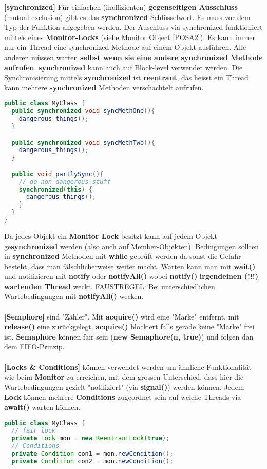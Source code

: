 \documentclass[8pt]{extarticle}
\let\oldtextbf\textbf
\renewcommand{\textbf}{\tiny\oldtextbf}
\begin{document}
\begin{multicols*}{5}
\textbf{[synchronized]} Für einfachen (ineffizienten) \textbf{gegenseitigen Ausschluss} (mutual exclusion) gibt es das \textbf{synchronized} Schlüsselwort. Es muss vor dem Typ der Funktion angegeben werden. Der Auschluss via synchronized funktioniert mittels eines \textbf{Monitor-Locks} (siehe Monitor Object [POSA2]). Es kann immer nur ein Thread eine synchronized Methode auf einem Objekt ausführen. Alle anderen müssen warten \textbf{selbst wenn sie eine andere synchronized Methode aufrufen}. \textbf{synchronized} kann auch auf Block-level verwendet werden. Die Synchronisierung mittels \textbf{synchronized} ist \textbf{reentrant}, das heisst ein Thread kann mehrere \textbf{synchronized} Methoden verschachtelt aufrufen.
\begin{lstlisting}[language=java]
public class MyClass {
  public synchronized void syncMethOne(){
    dangerous_things();
  }

  public synchronized void syncMethTwo(){
    dangerous_things();
  }

  public void partlySync(){
    // do non dangerous stuff
    synchronized(this) {
      dangerous_things();
    }
  }
}
\end{lstlisting}
Da jedes Objekt ein \textbf{Monitor Lock} besitzt kann auf jedem Objekt ge\textbf{synchronized} werden (also auch auf Member-Objekten). Bedingungen sollten in \textbf{synchronized} Methoden mit \textbf{while} geprüft werden da sonst die Gefahr besteht, dass man fälschlicherweise weiter macht. Warten kann man mit \textbf{wait()} und notifizieren mit \textbf{notify} oder \textbf{notifyAll()} wobei \textbf{notify()} \textbf{irgendeinen (!!!) wartenden Thread} weckt. FAUSTREGEL: Bei unterschiedlichen Wartebedingungen mit \textbf{notifyAll()} wecken.\\\\
\textbf{[Semphore]} sind "Zähler". Mit \textbf{acquire()} wird eine "Marke" entfernt, mit \textbf{release()} eine zurückgelegt. \textbf{acquire()} blockiert falls gerade keine "Marke" frei ist. \textbf{Semaphore} können fair sein (\textbf{new Semaphore(n, true)}) und folgen dan dem FIFO-Prinzip.\\\\
\textbf{[Locks \& Conditions]} können verwendet werden um ähnliche Funktionalität wie beim \textbf{Monitor} zu erreichen, mit dem grossen Unterschied, dass hier die Wartebedingungen gezielt "notifiziert" (via \textbf{signal()}) werden können. Jedem \textbf{Lock} können mehrere \textbf{Conditions} zugeordnet sein auf welche Threads via \textbf{await()} warten können.
\begin{lstlisting}[language=java]
public class MyClass {
  // fair lock
  private Lock mon = new ReentrantLock(true);
  // Conditions
  private Condition con1 = mon.newCondition();
  private Condition con2 = mon.newCondition();


\end{lstlisting}
\end{multicols*}
\end{document}
